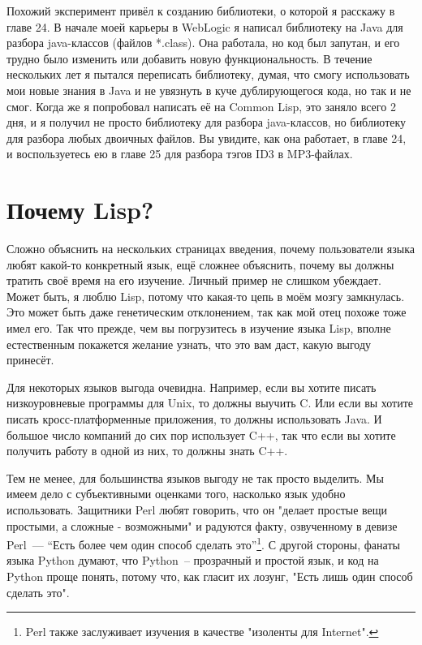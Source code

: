 Похожий эксперимент привёл к созданию библиотеки, о которой я расскажу в главе 24. В
начале моей карьеры в WebLogic я написал библиотеку на Java для разбора java-классов
(файлов *.class). Она работала, но код был запутан, и его трудно было изменить или
добавить новую функциональность. В течение нескольких лет я пытался переписать библиотеку,
думая, что смогу использовать мои новые знания в Java и не увязнуть в куче дублирующегося
кода, но так и не смог. Когда же я попробовал написать её на Common Lisp, это заняло всего
2 дня, и я получил не просто библиотеку для разбора java-классов, но библиотеку для
разбора любых двоичных файлов. Вы увидите, как она работает, в главе 24, и воспользуетесь
ею в главе 25 для разбора тэгов ID3 в MP3-файлах.

\section{Почему Lisp?}

Сложно объяснить на нескольких страницах введения, почему пользователи языка любят
какой-то конкретный язык, ещё сложнее объяснить, почему вы должны тратить своё время на
его изучение. Личный пример не слишком убеждает. Может быть, я люблю Lisp, потому что
какая-то цепь в моём мозгу замкнулась. Это может быть даже генетическим отклонением, так
как мой отец похоже тоже имел его. Так что прежде, чем вы погрузитесь в изучение языка
Lisp, вполне естественным покажется желание узнать, что это вам даст, какую выгоду
принесёт.

Для некоторых языков выгода очевидна. Например, если вы хотите писать низкоуровневые
программы для Unix, то должны выучить C. Или если вы хотите писать кросс-платформенные
приложения, то должны использовать Java. И большое число компаний до сих пор использует
C++, так что если вы хотите получить работу в одной из них, то должны знать C++.

Тем не менее, для большинства языков выгоду не так просто выделить. Мы имеем дело с
субъективными оценками того, насколько язык удобно использовать. Защитники Perl любят
говорить, что он "делает простые вещи простыми, а сложные - возможными" и радуются факту,
озвученному в девизе Perl~--- ``Есть более чем один способ сделать это''\footnote{Perl
  также заслуживает изучения в качестве "изоленты для Internet".}. С другой стороны,
фанаты языка Python думают, что Python~-- прозрачный и простой язык, и код на Python проще
понять, потому что, как гласит их лозунг, "Есть лишь один способ сделать это".

